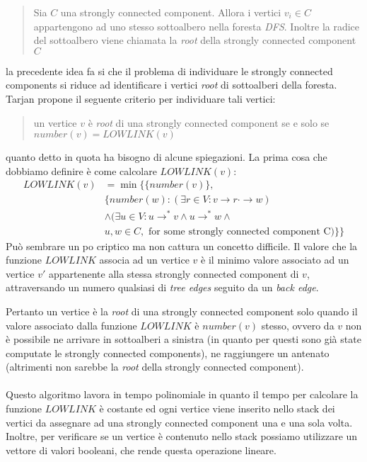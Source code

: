 \begin{quotation}
  Sia $C$ una strongly connected component. Allora i vertici $v_{i}
  \in C$ appartengono ad uno stesso sottoalbero nella foresta
  \emph{DFS}. Inoltre la radice del sottoalbero viene chiamata la
  \emph{root} della strongly connected component $C$
\end{quotation}
la precedente idea fa si che il problema di individuare le strongly
connected components si riduce ad identificare i vertici \emph{root} di
sottoalberi della foresta. Tarjan propone il seguente criterio per
individuare tali vertici:
\begin{quotation}
  un vertice $v$ \`e \emph{root} di una strongly connected component
  se e solo se $number(v) = LOWLINK(v)$ 
\end{quotation}
quanto detto in quota ha bisogno di alcune spiegazioni. La prima cosa
che dobbiamo definire \`e come calcolare $LOWLINK(v)$:
\begin{displaymath}
  \begin{split}
    LOWLINK(v) &= \min\{\{number(v)\}, \\
    & \{number(w): (\exists r \in V: v \rightarrow r \cdot\rightarrow w) \\
    & \wedge (\exists u \in V: u \rightarrow^{*} v \wedge u
    \rightarrow^{*} w \wedge \\
    & u,w \in C, \text{ for some strongly connected component C}) \}\}
  \end{split}
\end{displaymath}
Pu\`o sembrare un po criptico ma non cattura un concetto difficile. Il
valore che la funzione $LOWLINK$ associa ad un vertice $v$ \`e il
minimo valore associato ad un vertice $v'$ appartenente alla stessa
strongly connected component di $v$, attraversando un numero qualsiasi
di \emph{tree edges} seguito da un \emph{back edge}.

Pertanto un vertice \`e la \emph{root} di una strongly connected
component solo quando il valore associato dalla funzione $LOWLINK$ \`e
$number(v)$ stesso, ovvero da $v$ non \`e possibile ne arrivare in
sottoalberi a sinistra (in quanto per questi sono gi\`a state
computate le strongly connected components), ne raggiungere un
antenato (altrimenti non sarebbe la \emph{root} della strongly
connected component).
\\\\
Questo algoritmo lavora in tempo polinomiale in quanto il tempo per
calcolare la funzione $LOWLINK$ \`e costante ed ogni vertice viene
inserito nello stack dei vertici da assegnare ad una strongly
connected component una e una sola volta. Inoltre, per verificare se
un vertice \`e contenuto nello stack possiamo utilizzare un vettore di
valori booleani, che rende questa operazione lineare.

